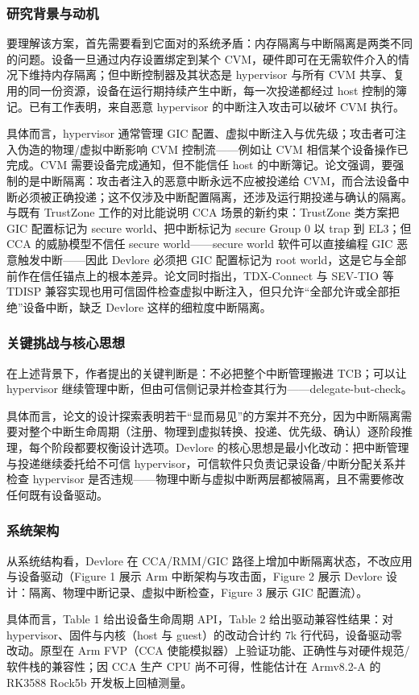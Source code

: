 \documentclass[11pt]{ctexart}
\begin{document}
\subsubsection{研究背景与动机}
要理解该方案，首先需要看到它面对的系统矛盾：内存隔离与中断隔离是两类不同的问题。设备一旦通过内存设置绑定到某个 CVM，硬件即可在无需软件介入的情况下维持内存隔离；但中断控制器及其状态是 hypervisor 与所有 CVM 共享、复用的同一份资源，设备在运行期持续产生中断，每一次投递都经过 host 控制的簿记。已有工作表明，来自恶意 hypervisor 的中断注入攻击可以破坏 CVM 执行。\par
具体而言，hypervisor 通常管理 GIC 配置、虚拟中断注入与优先级；攻击者可注入伪造的物理/虚拟中断影响 CVM 控制流——例如让 CVM 相信某个设备操作已完成。CVM 需要设备完成通知，但不能信任 host 的中断簿记。论文强调，要强制的是中断隔离：攻击者注入的恶意中断永远不应被投递给 CVM，而合法设备中断必须被正确投递；这不仅涉及中断配置隔离，还涉及运行期投递与确认的隔离。与既有 TrustZone 工作的对比能说明 CCA 场景的新约束：TrustZone 类方案把 GIC 配置标记为 secure world、把中断标记为 secure Group 0 以 trap 到 EL3；但 CCA 的威胁模型不信任 secure world——secure world 软件可以直接编程 GIC 恶意触发中断——因此 Devlore 必须把 GIC 配置标记为 root world，这是它与全部前作在信任锚点上的根本差异。论文同时指出，TDX-Connect 与 SEV-TIO 等 TDISP 兼容实现也用可信固件检查虚拟中断注入，但只允许“全部允许或全部拒绝”设备中断，缺乏 Devlore 这样的细粒度中断隔离。\par
\subsubsection{关键挑战与核心思想}
在上述背景下，作者提出的关键判断是：不必把整个中断管理搬进 TCB；可以让 hypervisor 继续管理中断，但由可信侧记录并检查其行为——delegate-but-check。\par
具体而言，论文的设计探索表明若干“显而易见”的方案并不充分，因为中断隔离需要对整个中断生命周期（注册、物理到虚拟转换、投递、优先级、确认）逐阶段推理，每个阶段都要权衡设计选项。Devlore 的核心思想是最小化改动：把中断管理与投递继续委托给不可信 hypervisor，可信软件只负责记录设备/中断分配关系并检查 hypervisor 是否违规——物理中断与虚拟中断两层都被隔离，且不需要修改任何既有设备驱动。\par
\subsubsection{系统架构}
从系统结构看，Devlore 在 CCA/RMM/GIC 路径上增加中断隔离状态，不改应用与设备驱动（Figure 1 展示 Arm 中断架构与攻击面，Figure 2 展示 Devlore 设计：隔离、物理中断记录、虚拟中断检查，Figure 3 展示 GIC 配置流）。\par
具体而言，Table 1 给出设备生命周期 API，Table 2 给出驱动兼容性结果：对 hypervisor、固件与内核（host 与 guest）的改动合计约 7k 行代码，设备驱动零改动。原型在 Arm FVP（CCA 使能模拟器）上验证功能、正确性与对硬件规范/软件栈的兼容性；因 CCA 生产 CPU 尚不可得，性能估计在 Armv8.2-A 的 RK3588 Rock5b 开发板上回植测量。\par
\end{document}
